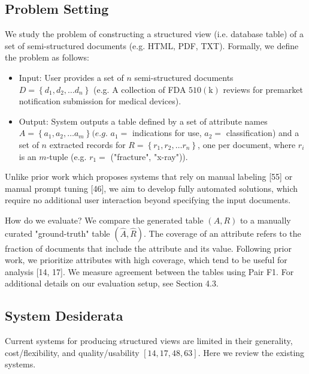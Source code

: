 \documentclass[10pt]{article}
\begin{document}
\subsection{Problem Setting}
We study the problem of constructing a structured view (i.e. database table) of a set of semi-structured documents (e.g. HTML, PDF, TXT). Formally, we define the problem as follows:

\begin{itemize}
  \item Input: User provides a set of $n$ semi-structured documents $D=\left\{d_{1}, d_{2}, \ldots d_{n}\right\}$ (e.g. A collection of FDA $510(\mathrm{k})$ reviews for premarket notification submission for medical devices).

  \item Output: System outputs a table defined by a set of attribute names $A=\left\{a_{1}, a_{2}, \ldots a_{m}\right\}(e . g$. $a_{1}=$ indications for use, $a_{2}=$ classification) and a set of $n$ extracted records for $R=\left\{r_{1}, r_{2}, \ldots r_{n}\right\}$, one per document, where $r_{i}$ is an $m$-tuple (e.g. $r_{1}=$ ("fracture", "x-ray")).

\end{itemize}

Unlike prior work which proposes systems that rely on manual labeling [55] or manual prompt tuning [46], we aim to develop fully automated solutions, which require no additional user interaction beyond specifying the input documents.

How do we evaluate? We compare the generated table $(A, R)$ to a manually curated "ground-truth" table $(\hat{A}, \hat{R})$. The coverage of an attribute refers to the fraction of documents that include the attribute and its value. Following prior work, we prioritize attributes with high coverage, which tend to be useful for analysis [14, 17]. We measure agreement between the tables using Pair F1. For additional details on our evaluation setup, see Section 4.3.

\subsection{System Desiderata}
Current systems for producing structured views are limited in their generality, cost/flexibility, and quality/usability $[14,17,48,63]$. Here we review the existing systems.
\end{document}
